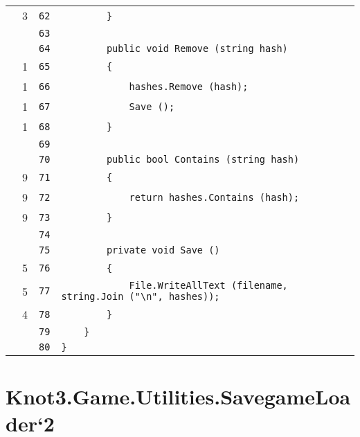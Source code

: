 \documentclass[a4paper,10pt]{article}
\begin{document}
\begin{longtable}[l]{lrrl}
\cellcolor{green} & 3 & \verb~62~ & \verb~        }~\\
\cellcolor{gray} &  & \verb~63~ & \verb~~\\
\cellcolor{gray} &  & \verb~64~ & \verb~        public void Remove (string hash)~\\
\cellcolor{green} & 1 & \verb~65~ & \verb~        {~\\
\cellcolor{green} & 1 & \verb~66~ & \verb~            hashes.Remove (hash);~\\
\cellcolor{green} & 1 & \verb~67~ & \verb~            Save ();~\\
\cellcolor{green} & 1 & \verb~68~ & \verb~        }~\\
\cellcolor{gray} &  & \verb~69~ & \verb~~\\
\cellcolor{gray} &  & \verb~70~ & \verb~        public bool Contains (string hash)~\\
\cellcolor{green} & 9 & \verb~71~ & \verb~        {~\\
\cellcolor{green} & 9 & \verb~72~ & \verb~            return hashes.Contains (hash);~\\
\cellcolor{green} & 9 & \verb~73~ & \verb~        }~\\
\cellcolor{gray} &  & \verb~74~ & \verb~~\\
\cellcolor{gray} &  & \verb~75~ & \verb~        private void Save ()~\\
\cellcolor{green} & 5 & \verb~76~ & \verb~        {~\\
\cellcolor{green} & 5 & \verb~77~ & \verb~            File.WriteAllText (filename, string.Join ("\n", hashes));~\\
\cellcolor{green} & 4 & \verb~78~ & \verb~        }~\\
\cellcolor{gray} &  & \verb~79~ & \verb~    }~\\
\cellcolor{gray} &  & \verb~80~ & \verb~}~\\
\end{longtable}
\newpage
\section{Knot3.Game.Utilities.SavegameLoader`2}
\end{document}
